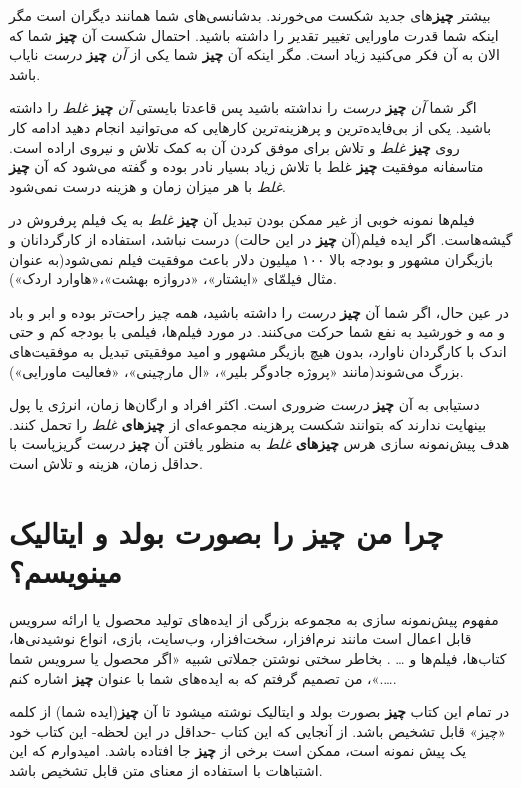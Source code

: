 بیشتر \textbf{چیز}های جدید شکست می‌خورند. بدشانسی‌های شما همانند دیگران
است مگر اینکه شما قدرت ماورایی تغییر تقدیر را داشته باشید. احتمال شکست
آن \textbf{چیز} شما که الان به آن فکر می‌کنید زیاد است. مگر اینکه آن
\textbf{چیز} شما یکی از \emph{آن} \textbf{چیز} \emph{درست} نایاب باشد.

اگر شما \emph{آن} \textbf{چیز} \emph{درست} را نداشته باشید پس قاعدتا
بایستی \emph{آن} \textbf{چیز} \emph{غلط} را داشته باشید. یکی از
بی‌فایده‌ترین و پرهزینه‌ترین کارهایی که می‌توانید انجام دهید ادامه کار
روی \textbf{چیز} \emph{غلط} و تلاش برای موفق کردن آن به کمک تلاش و نیروی
اراده است. متاسفانه موفقیت \textbf{چیز} غلط با تلاش زیاد بسیار نادر بوده
و گفته می‌شود که آن \textbf{چیز} \emph{غلط} با هر میزان زمان و هزینه
درست نمی‌شود.

فیلم‌ها نمونه خوبی از غیر ممکن بودن تبدیل آن \textbf{چیز} \emph{غلط} به
یک فیلم پرفروش در گیشه‌هاست. اگر ایده فیلم(آن \textbf{چیز} در این حالت)
درست نباشد، استفاده از کارگردانان و بازیگران مشهور و بودجه بالا ۱۰۰
میلیون دلار باعث موفقیت فیلم نمی‌شود(به عنوان مثال فیلمّای «ایشتار»،
«دروازه بهشت»،«هاوارد اردک»).

در عین حال، اگر شما آن \textbf{چیز} \emph{درست} را داشته باشید، همه چیز
راحت‌تر بوده و ابر و باد و مه و خورشید به نفع شما حرکت می‌کنند. در مورد
فیلم‌ها، فیلمی با بودجه کم و حتی اندک با کارگردان ناوارد، بدون هیچ
بازیگر مشهور و امید موفقیتی تبدیل به موفقیت‌های بزرگ می‌شوند(مانند
«پروژه جادوگر بلیر»، «ال مارچینی»، «فعالیت ماورایی»).

دستیابی به آن \textbf{چیز} \emph{درست} ضروری است. اکثر افراد و ارگان‌ها
زمان، انرژی یا پول بینهایت ندارند که بتوانند شکست پرهزینه مجموعه‌ای از
\textbf{چیزهای} \emph{غلط} را تحمل کنند. هدف پیش‌نمونه سازی هرس
\textbf{چیزهای} \emph{غلط} به منظور یافتن آن \textbf{چیز} \emph{درست}
گریزپاست با حداقل زمان، هزینه و تلاش است.

\section{چرا من \textbf{چیز} را بصورت بولد و ایتالیک
مینویسم؟}\label{ux686ux631ux627-ux645ux646-ux686ux6ccux632-ux631ux627-ux628ux635ux648ux631ux62a-ux628ux648ux644ux62f-ux648-ux627ux6ccux62aux627ux644ux6ccux6a9-ux645ux6ccux646ux648ux6ccux633ux645}

مفهوم پیش‌نمونه سازی به مجموعه بزرگی از ایده‌های تولید محصول یا ارائه
سرویس قابل اعمال است مانند نرم‌افزار، سخت‌افزار، وب‌سایت، بازی، انواع
نوشیدنی‌ها، کتاب‌ها، فیلم‌ها و \ldots{} . بخاطر سختی نوشتن جملاتی شبیه
«اگر محصول یا سرویس شما \ldots{}.»، من تصمیم گرفتم که به ایده‌های شما با
عنوان \textbf{چیز} اشاره کنم.

در تمام این کتاب \textbf{چیز} بصورت بولد و ایتالیک نوشته میشود تا آن
\textbf{چیز}(ایده شما) از کلمه «چیز» قابل تشخیص باشد. از آنجایی که این
کتاب -حداقل در این لحظه- این کتاب خود یک پیش نمونه است، ممکن است برخی از
\textbf{چیز} جا افتاده باشد. امیدوارم که این اشتباهات با استفاده از
معنای متن قابل تشخیص باشد.

